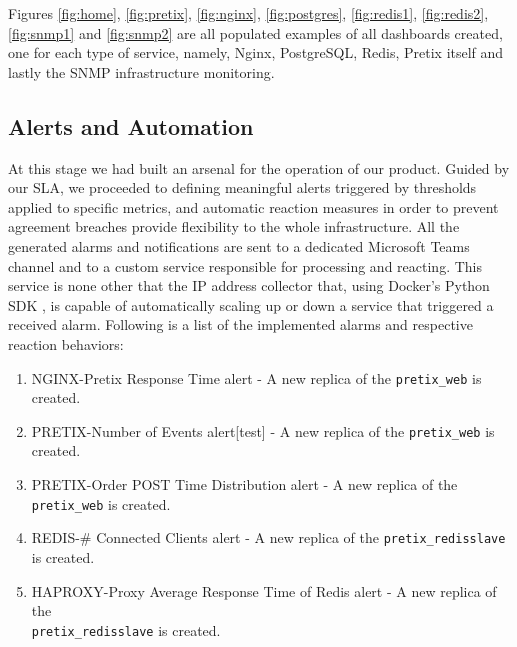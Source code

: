 \documentclass[12pt]{article}
\begin{document}
Figures \ref{fig:home}, \ref{fig:pretix}, \ref{fig:nginx}, \ref{fig:postgres}, \ref{fig:redis1}, \ref{fig:redis2}, \ref{fig:snmp1} and \ref{fig:snmp2} are all populated examples of all dashboards created, one for each type of service, namely, Nginx, PostgreSQL, Redis, Pretix itself and lastly the SNMP infrastructure monitoring.

\subsection{Alerts and Automation} \label{management.automation} %


At this stage we had built an arsenal for the operation of our product.
Guided by our SLA, we proceeded to defining meaningful alerts triggered by thresholds applied to specific metrics, and automatic reaction measures in order to
prevent agreement breaches provide flexibility to the whole infrastructure.
All the generated alarms and notifications are sent to a dedicated Microsoft Teams channel and to a custom service responsible for processing and reacting.
This service is none other that the IP address collector that, using Docker's Python SDK \cite{dockerpythonsdk}, is capable of automatically scaling up or down
a service that triggered a received alarm.
Following is a list of the implemented alarms and respective reaction behaviors:

\vspace{-10pt}
\begin{enumerate}[noitemsep]
  \item NGINX-Pretix Response Time alert - A new replica of the \texttt{pretix\_web} is created.
  \item PRETIX-Number of Events alert[test] - A new replica of the \texttt{pretix\_web} is created.
  \item PRETIX-Order POST Time Distribution alert - A new replica of the \texttt{pretix\_web} is created.
  \item REDIS-\# Connected Clients alert - A new replica of the \texttt{pretix\_redisslave} is created.
  \item HAPROXY-Proxy Average Response Time of Redis alert - A new replica of the \\\texttt{pretix\_redisslave} is created.
\end{enumerate}
\vspace{-10pt}
\end{document}
